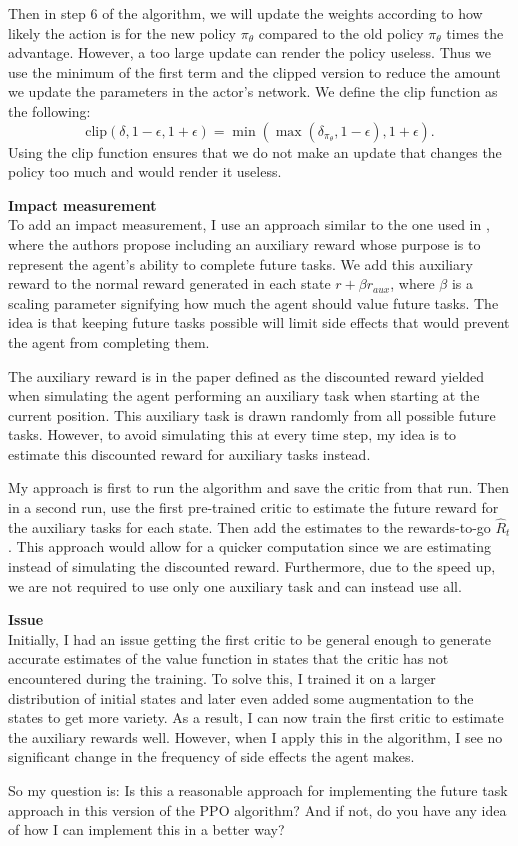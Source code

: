 \documentclass[12pt,A4]{report}
\begin{document}
Then in step 6 of the algorithm, we will update the weights according to how likely the action is for the new policy $\pi_\theta$ compared to the old policy $\pi_\theta$ times the advantage. However, a too large update can render the policy useless. Thus we use the minimum of the first term and the clipped version to reduce the amount we update the parameters in the actor's network. We define the clip function as the following: 
\[ \text{clip}(\delta, 1-\epsilon, 1+\epsilon) = \min( \max(\delta_{\pi_\theta}, 1-\epsilon), 1 + \epsilon).\]
Using the clip function ensures that we do not make an update that changes the policy too much and would render it useless. 

\textbf{Impact measurement} \\
To add an impact measurement, I use an approach similar to the one used in \citet{Krakovna20}, where the authors propose including an auxiliary reward whose purpose is to represent the agent's ability to complete future tasks. We add this auxiliary reward to the normal reward generated in each state $r + \beta r_{aux}$, where $\beta$ is a scaling parameter signifying how much the agent should value future tasks. The idea is that keeping future tasks possible will limit side effects that would prevent the agent from completing them. 

The auxiliary reward is in the paper defined as the discounted reward yielded when simulating the agent performing an auxiliary task when starting at the current position. This auxiliary task is drawn randomly from all possible future tasks. However, to avoid simulating this at every time step, my idea is to estimate this discounted reward for auxiliary tasks instead.

My approach is first to run the algorithm and save the critic from that run. Then in a second run, use the first pre-trained critic to estimate the future reward for the auxiliary tasks for each state. Then add the estimates to the rewards-to-go $\hat{R}_t$. This approach would allow for a quicker computation since we are estimating instead of simulating the discounted reward. Furthermore, due to the speed up, we are not required to use only one auxiliary task and can instead use all. 


\textbf{Issue}\\
Initially, I had an issue getting the first critic to be general enough to generate accurate estimates of the value function in states that the critic has not encountered during the training. To solve this, I trained it on a larger distribution of initial states and later even added some augmentation to the states to get more variety. As a result, I can now train the first critic to estimate the auxiliary rewards well. However, when I apply this in the algorithm, I see no significant change in the frequency of side effects the agent makes. 

So my question is: Is this a reasonable approach for implementing the future task approach in this version of the PPO algorithm? And if not, do you have any idea of how I can implement this in a better way?




\end{document}
